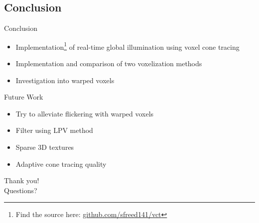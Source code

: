 \documentclass[10pt]{beamer}
\begin{document}



\subsection{Conclusion}
\begin{frame}{Conclusion}
  \begin{itemize}
    \item Implementation\footnote{Find the source here: \url{github.com/sfreed141/vct}} of real-time global illumination using voxel cone tracing
    \item Implementation and comparison of two voxelization methods
    \item Investigation into warped voxels
  \end{itemize}
\end{frame}

\begin{frame}{Future Work}


  \begin{itemize}
    \item Try to alleviate flickering with warped voxels %
    \item Filter using LPV method %
    \item Sparse 3D textures %
    \item Adaptive cone tracing quality %
  \end{itemize}
\end{frame}

\begin{frame}[standout]
  \LARGE Thank you!\\
  \vspace{1cm}
  \LARGE Questions?
\end{frame}

\end{document}
